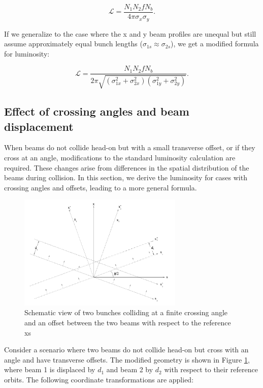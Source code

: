 \begin{equation}
\mathcal{L} = \frac{N_1  N_2  f N_b}{4 \pi  \sigma_x \sigma_y}.
\end{equation}

If we generalize to the case where the x and y beam profiles are unequal but still assume approximately equal bunch lengths (\( \sigma_{1s} \approx \sigma_{2s} \)), we get a modified formula for luminosity:

\begin{equation}
\mathcal{L} = \frac{N_1  N_2  f  N_b}{2 \pi \sqrt{(\sigma_{1x}^2 + \sigma_{2x}^2)(\sigma_{1y}^2 + \sigma_{2y}^2)}}.
\end{equation}

\subsection{Effect of crossing angles and beam displacement}
When beams do not collide head-on but with a small transverse offset, or if they cross at an angle, modifications to the standard luminosity calculation are required. These changes arise from differences in the spatial distribution of the beams during collision. In this section, we derive the luminosity for cases with crossing angles and offsets, leading to a more general formula.

\begin{figure}
    \centering
    \includegraphics[width=0.7\textwidth]{figures/lumi_geometry.png}
    \caption{Schematic view of two bunches colliding at a finite crossing angle and an offset between the two beams with respect to the reference xs}
    \label{fig:lumi-geometry}
\end{figure}

Consider a scenario where two beams do not collide head-on but cross with an angle and have transverse offsets. The modified geometry is shown in Figure \ref{fig:lumi-geometry}, where beam 1 is displaced by \(d_1\) and beam 2 by \(d_2\) with respect to their reference orbits. The following coordinate transformations are applied:

